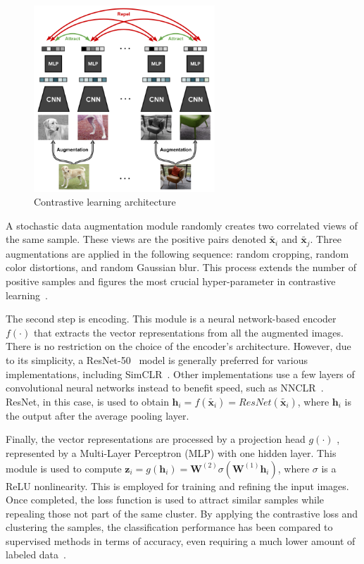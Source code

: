 \documentclass[12pt]{article}
\begin{document}
\begin{figure}[ht]
\centering
\includegraphics[height=7cm]{res/contrastive_learning}
\caption{\label{figure:contrastive_learning}Contrastive learning architecture~\citep{ashish2020}}
\end{figure}

A stochastic data augmentation module randomly creates two correlated views of the same sample. These views are the positive pairs denoted ${\tilde{\boldsymbol{x}_i}}$ and $\tilde{\boldsymbol{x}_j}$. Three augmentations are applied in the following sequence: random cropping, random color distortions, and random Gaussian blur. This process extends the number of positive samples and figures the most crucial hyper-parameter in contrastive learning~\citep{chen2020}.

The second step is encoding. This module is a neural network-based encoder $f(\cdot)$ that extracts the vector representations from all the augmented images. There is no restriction on the choice of the encoder's architecture. However, due to its simplicity, a ResNet-50~\citep{zhang2016} model is generally preferred for various implementations, including SimCLR~\citep{chen2020}. Other implementations use a few layers of convolutional neural networks instead to benefit speed, such as NNCLR~\citep{dwibedi2021}. ResNet, in this case, is used to obtain $ \boldsymbol{h}_i=f(\tilde{\boldsymbol{x}_i})=ResNet(\tilde{\boldsymbol{x}_i})$, where $\boldsymbol{h}_i$ is the output after the average pooling layer.

Finally, the vector representations are processed by a projection head $g(\cdot)$ , represented by a Multi-Layer Perceptron (MLP) with one hidden layer. This module is used to compute $\boldsymbol{z}_i = g(\boldsymbol{h}_i) = \boldsymbol{W}^{(2)}\sigma(\boldsymbol{W}^{(1)}\boldsymbol{h}_i)$, where $\sigma$ is a ReLU nonlinearity. This is employed for training and refining the input images. Once completed, the loss function is used to attract similar samples while repealing those not part of the same cluster. By applying the contrastive loss and clustering the samples, the classification performance has been compared to supervised methods in terms of accuracy, even requiring a much lower amount of labeled data~\citep{chen2020}.
\end{document}
